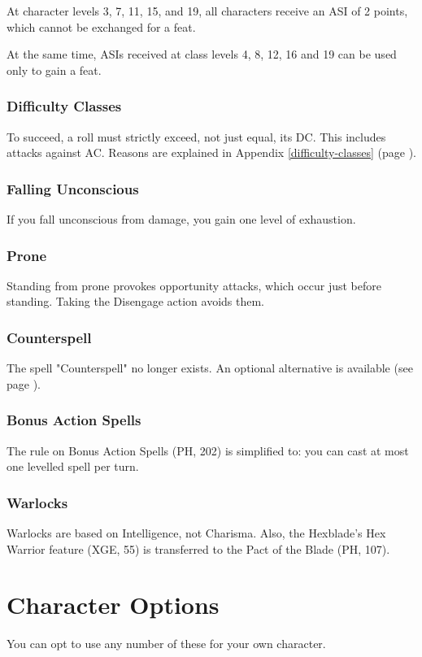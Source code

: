 \documentclass[letterpaper,twocolumn,openany,nodeprecatedcode,bg=print]{dndbook}
\newcommand{\pg}[1]{page \pageref{#1}}
\newcommand{\see}[1]{(see \pg{#1})}
\begin{document}
At character levels 3, 7, 11, 15, and 19, all characters receive an ASI of 2 points, which cannot be exchanged for a feat.

At the same time, ASIs received at class levels 4, 8, 12, 16 and 19 can be used only to gain a feat.

\subsection{Difficulty Classes}
To succeed, a roll must strictly exceed, not just equal, its DC. 
This includes attacks against AC. 
Reasons are explained in Appendix \ref{difficulty-classes} (\pg{difficulty-classes}).

\subsection{Falling Unconscious}
If you fall unconscious from damage, you gain one level of exhaustion.

\subsection{Prone}
Standing from prone provokes opportunity attacks, which occur just before standing. 
Taking the Disengage action avoids them.

\subsection{Counterspell}
The spell "Counterspell" no longer exists. 
An optional alternative is available \see{counterspell}.

\subsection{Bonus Action Spells}
The rule on Bonus Action Spells (PH, 202) is simplified to: 
you can cast at most one levelled spell per turn.

\subsection{Warlocks}
Warlocks are based on Intelligence, not Charisma. 
Also, the Hexblade's Hex Warrior feature (XGE, 55) is transferred to the Pact of the Blade (PH, 107).










\chapter{Character Options}
\noindent You can opt to use any number of these for your own character.
\end{document}
